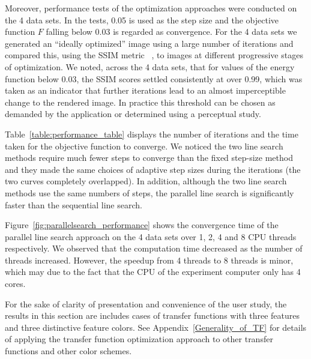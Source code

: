 Moreover, performance tests of the optimization approaches were conducted on the 4 data sets. In the tests, 0.05 is used as the step size and the objective function $ F $ falling below 0.03 is regarded as convergence. For the 4 data sets we generated an ``ideally optimized'' image using a large number of iterations and compared this, using the SSIM metric ~\cite{Wang2004SSIM}, to images at different progressive stages of optimization. We noted, across the 4 data sets, that for values of the energy function below 0.03, the SSIM scores settled consistently at over 0.99, which was taken as an indicator that further iterations lead to an almost imperceptible change to the rendered image. In practice this threshold can be chosen as demanded by the application or determined using a perceptual study.

Table~\ref{table:performance_table} displays the number of iterations and the time taken for the objective function to converge.
We noticed the two line search methods require much fewer steps to converge than the fixed step-size method and they made the same choices of adaptive step sizes during the iterations (the two curves completely overlapped).
In addition, although the two line search methods use the same numbers of steps, the parallel line search is significantly faster than the sequential line search.

Figure~\ref{fig:parallelsearch_performance} shows the convergence time of the parallel line search approach on the 4 data sets over 1, 2, 4 and 8 CPU threads respectively.
We observed that the computation time decreased as the number of threads increased. However, the speedup from 4 threads to 8 threads is minor, which may due to the fact that the CPU of the experiment computer only has 4 cores.

For the sake of clarity of presentation and convenience of the user study, the results in this section are includes cases of transfer functions with three features and three distinctive feature colors. See Appendix~\ref{Generality_of_TF} for details of applying the transfer function optimization approach to other transfer functions and other color schemes.

